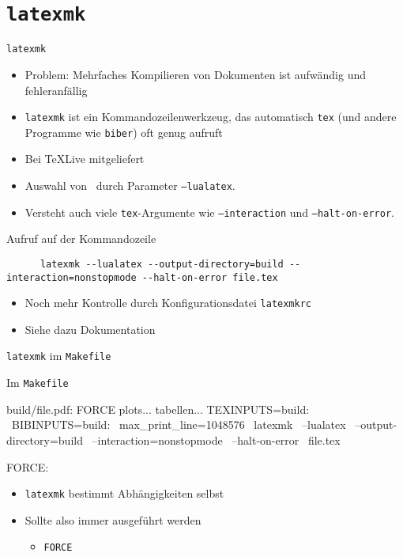 \section{\texttt{latexmk}}

\begin{frame}[fragile]{
  \texttt{latexmk}
  \hfill
}
  \begin{itemize}
    \item Problem: Mehrfaches Kompilieren von Dokumenten ist aufwändig und fehleranfällig
    \item \texttt{latexmk} ist ein Kommandozeilenwerkzeug, das automatisch \texttt{tex} (und andere Programme wie \texttt{biber}) oft genug aufruft
    \item Bei TeXLive mitgeliefert
    \item Auswahl von \LuaLaTeX\ durch Parameter \texttt{--lualatex}.
    \item Versteht auch viele \texttt{tex}-Argumente wie \texttt{--interaction} und \texttt{--halt-on-error}.
  \end{itemize}

  \begin{block}{Aufruf auf der Kommandozeile}
    \begin{lstlisting}
      latexmk --lualatex --output-directory=build --interaction=nonstopmode --halt-on-error file.tex
    \end{lstlisting}
  \end{block}

  \begin{itemize}
    \item Noch mehr Kontrolle durch Konfigurationsdatei \texttt{latexmkrc}
    \item Siehe dazu Dokumentation
  \end{itemize}
\end{frame}

\begin{frame}[fragile]{\texttt{latexmk} im \texttt{Makefile}}
  \begin{block}{Im \texttt{Makefile}}
    \begin{lstmake}
      build/file.pdf: FORCE plots... tabellen...
            TEXINPUTS=build: \
            BIBINPUTS=build: \
            max_print_line=1048576 \
          latexmk \
            --lualatex \
            --output-directory=build \
            --interaction=nonstopmode \
            --halt-on-error \
          file.tex

      FORCE:
    \end{lstmake}
  \end{block}

  \begin{itemize}
    \item \texttt{latexmk} bestimmt Abhängigkeiten selbst
    \item Sollte also immer ausgeführt werden
      \begin{itemize}
        \item \texttt{FORCE}
      \end{itemize}
  \end{itemize}
\end{frame}
